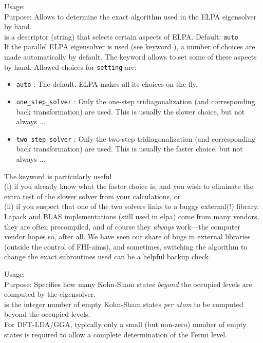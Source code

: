 {
  \noindent
  Usage:   \\[1.0ex]
  Purpose: Allows to determine the exact algorithm used in the ELPA
    eigensolver by hand. \\[1.0ex]
   is a descriptor (string) that selects certain aspects of
  ELPA. Default: \texttt{auto} \\
}
If the parallel ELPA eigensolver is used (see keyword
), a number of choices are made automatically by
default. The  keyword allows to set some of
these aspects by hand. Allowed choices for \texttt{setting} are:
\begin{itemize}
  \item \texttt{auto} : The default. ELPA makes all its choices on the fly.
  \item \texttt{one\_step\_solver} : Only the one-step
    tridiagonalization (and corresponding back transformation) are
    used. This is usually the slower choice, but not always ...
  \item \texttt{two\_step\_solver} : Only the two-step
    tridiagonalization (and corresponding back transformation) are
    used. This is usually the faster choice, but not always ...
\end{itemize}
The  keyword is particularly useful \\ 
(i) if you already know what the faster choice is, and you wish to
eliminate the extra test of the slower solver from your calculations,
or \\
(ii) if you suspect that one of the two solvers links to a buggy
external(!) library. Lapack and BLAS implementations (still used in
elpa) come from many vendors, they are often precompiled, and of
course they \emph{always} work---the computer vendor hopes so, after
all. We have seen our share of bugs in external libraries (outside the
control of FHI-aims), and sometimes, switching the algorithm to change
the exact subroutines used can be a helpful backup check.


{
  \noindent
  Usage:   \\[1.0ex]
  Purpose: Specifies how many Kohn-Sham states \emph{beyond} the
    occupied levels are computed by the eigensolver. \\[1.0ex]
   is the integer number of empty Kohn-Sham states
    \emph{per atom} to be computed beyond the occupied
    levels. \\
}
For DFT-LDA/GGA, typically only a small (but non-zero) number of empty states
is required to allow a complete determination of the Fermi level.

